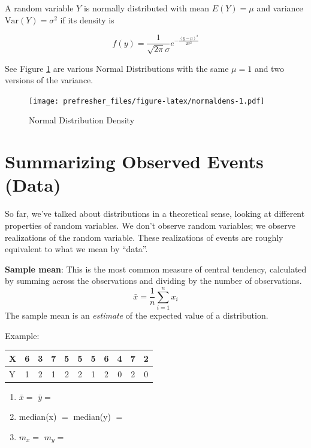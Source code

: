 \documentclass[]{book}
\theoremstyle{definition}
\theoremstyle{definition}
\theoremstyle{definition}
\theoremstyle{remark}
\let\BeginKnitrBlock\begin \let\EndKnitrBlock\end
\begin{document}

\BeginKnitrBlock{definition}[Normal Distribution]
\protect\hypertarget{def:unnamed-chunk-93}{}{\label{def:unnamed-chunk-93} {} }
A random variable \(Y\) is normally distributed with mean \(E(Y)=\mu\) and variance \(\text{Var}(Y)=\sigma^2\) if its density is

\[f(y)=\frac{1}{\sqrt{2\pi}\sigma}e^{-\frac{(y-\mu)^2}{2\sigma^2}}\]
\EndKnitrBlock{definition}

See Figure \ref{fig:normaldens} are various Normal Distributions with the same \(\mu = 1\) and two versions of the variance.

\begin{figure}
\centering
\texttt{[image: prefresher\_files/figure-latex/normaldens-1.pdf]}
\caption{\label{fig:normaldens}Normal Distribution Density}
\end{figure}

\hypertarget{summarizing-observed-events-data}{%
\section{Summarizing Observed Events (Data)}\label{summarizing-observed-events-data}}

So far, we've talked about distributions in a theoretical sense, looking at different properties of random variables. We don't observe random variables; we observe realizations of the random variable. These realizations of events are roughly equivalent to what we mean by ``data''.

\textbf{Sample mean}: This is the most common measure of central tendency, calculated by summing across the observations and dividing by the number of observations.
\[\bar{x} = \frac{1}{n}\sum_{i=1}^{n}x_i\]
The sample mean is an \emph{estimate} of the expected value of a distribution.

\begin{framed}
Example:  
\begin{center}
\begin{tabular}{|l|cccccccccc|}
\hline
X & 6 & 3 & 7 & 5 & 5 & 5 & 6 & 4 & 7 & 2\\
\hline
Y & 1 & 2 & 1 & 2 & 2 & 1 & 2 & 0 & 2 & 0\\
\hline
\end{tabular}
\end{center}

\begin{enumerate}
\item $\bar{x} = $ \hspace{3.1cm} $\bar{y} = $
\item median(x) $ = $ \hspace{1.5cm} median(y) $ = $
\item $m_x = $ \hspace{2.75cm} $m_y =$\\
\end{enumerate}
\end{framed}
\end{document}
